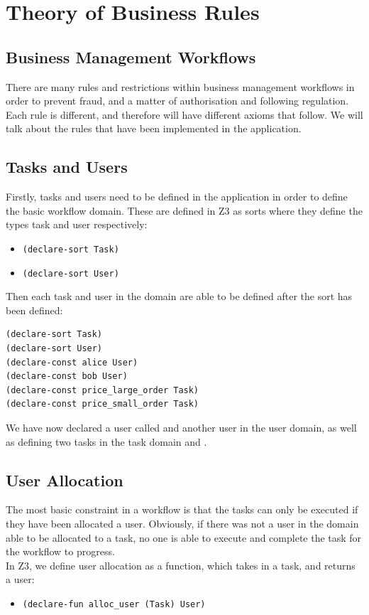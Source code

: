 \documentclass[a4paper]{report}
\begin{document}
\chapter{Theory of Business Rules}
\section{Business Management Workflows}
There are many rules and restrictions within business management workflows in order to prevent fraud, and a matter of authorisation and following regulation. Each rule is different, and therefore will have different axioms that follow. We will talk about the rules that have been implemented in the application.\\

\section{Tasks and Users}
Firstly, tasks and users need to be defined in the application in order to define the basic workflow domain. These are defined in Z3 as sorts where they define the types task and user respectively:
\begin{itemize}
\item \texttt{(declare-sort Task)}
\item \texttt{(declare-sort User)}
\end{itemize}
Then each task and user in the domain are able to be defined after the sort has been defined: \\
\lstset{numbers=left, showspaces=false,
    showstringspaces=false, tabsize=2, breaklines=true,
    xleftmargin=5.0ex,
}
\begin{lstlisting}[frame=single]
(declare-sort Task)
(declare-sort User)
(declare-const alice User)
(declare-const bob User)
(declare-const price_large_order Task)
(declare-const price_small_order Task)
\end{lstlisting}
We have now declared a user called  and another user  in the user domain, as well as defining two tasks in the task domain  and . 

\section{User Allocation}
The most basic constraint in a workflow is that the tasks can only be executed if they have been allocated a user. Obviously, if there was not a user in the domain able to be allocated to a task, no one is able to execute and complete the task for the workflow to progress.\\
In Z3, we define user allocation as a function, which takes in a task, and returns a user:
\begin{itemize}
\item \texttt{(declare-fun alloc\_user (Task) User)}
\end{itemize}
\end{document}
